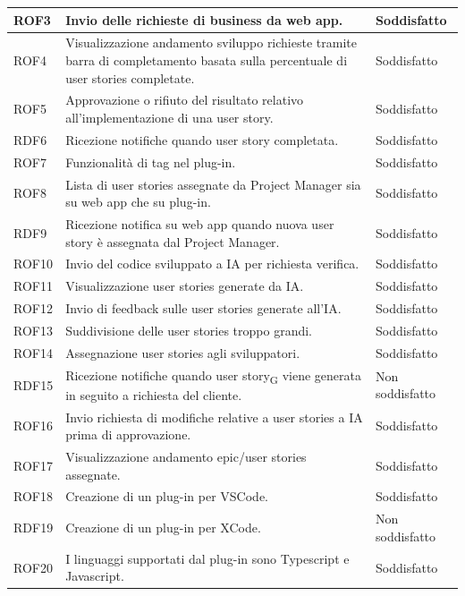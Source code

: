 \documentclass{article}
\begin{document}
\begin{center}
\begin{tabular}{|P{2cm}| P{10cm}| P{4cm}|}
\hline
ROF3& Invio delle richieste di business da web app. & Soddisfatto\\
\hline
{}
ROF4& Visualizzazione andamento sviluppo richieste tramite barra di completamento basata sulla percentuale di user stories completate. & Soddisfatto\\
\hline
ROF5 & Approvazione o rifiuto del risultato relativo all'implementazione di una user story. & Soddisfatto \\
\hline
{}
RDF6 &  Ricezione notifiche quando user story completata. & Soddisfatto\\
\hline
{}
ROF7 &  Funzionalità di tag nel plug-in.  & Soddisfatto\\
\hline
{}
ROF8 & Lista di user stories assegnate da Project Manager sia su web app che su plug-in. & Soddisfatto \\
\hline
{}
RDF9 & Ricezione notifica su web app quando nuova user story è assegnata dal Project Manager. & Soddisfatto\\
\hline
{}
ROF10 & Invio del codice sviluppato a IA per richiesta verifica.& Soddisfatto\\
\hline
{}
ROF11 & Visualizzazione user stories generate da IA.  &Soddisfatto\\
\hline
{}
ROF12& Invio di feedback sulle user stories generate all'IA.& Soddisfatto \\
\hline
{}
ROF13&Suddivisione delle user stories troppo grandi.  & Soddisfatto\\
\hline
{}
ROF14 & Assegnazione user stories agli sviluppatori.& Soddisfatto\\
\hline
{}
RDF15 & Ricezione notifiche quando user story\textsubscript{G} viene generata in seguito a richiesta del cliente. & Non soddisfatto\\
\hline
{}
ROF16& Invio richiesta di modifiche relative a user stories a IA prima di approvazione. & Soddisfatto\\
\hline
{}
ROF17&Visualizzazione andamento epic/user stories assegnate.& Soddisfatto\\
\hline
{}
ROF18& Creazione di un plug-in per VSCode.& Soddisfatto\\
\hline
{}
RDF19& Creazione di un plug-in per XCode.& Non soddisfatto\\
\hline
{}
ROF20& I linguaggi supportati dal plug-in sono Typescript e Javascript. & Soddisfatto\\
\hline
\end{tabular}



\end{center}
\end{document}
